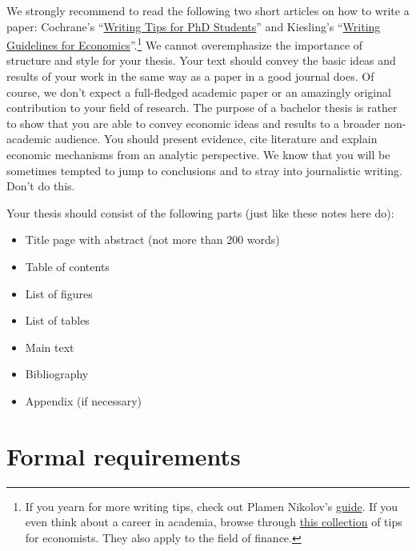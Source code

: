\documentclass[a4paper, 12pt]{article}
\begin{document}
	We strongly recommend to read the following two short articles on how to write a paper: Cochrane's ``\href{http://faculty.wcas.northwestern.edu/~mdo738/teaching/cochrane.pdf}{Writing Tips for PhD Students}'' and Kiesling's ``\href{http://nuwrite.northwestern.edu/communities/social-sciences/economics/docs/writing-advice-for-papers-in-economics/Kiesling\%20writingguidelines.pdf}{Writing Guidelines for Economics}''.\footnote{If you yearn for more writing tips, check out Plamen Nikolov's \href{http://www.people.fas.harvard.edu/~pnikolov/resources/writingtips.pdf}{guide}. If you even think about a career in academia, browse through \href{https://sites.google.com/site/mkudamatsu/tips4economists}{this collection} of tips for economists. They also apply to the field of finance.} We cannot overemphasize the importance of structure and style for your thesis. Your text should convey the basic ideas and results of your work in the same way as a paper in a good journal does. Of course, we don't expect a full-fledged academic paper or an amazingly original contribution to your field of research. The purpose of a bachelor thesis is rather to show that you are able to convey economic ideas and results to a broader non-academic audience. You should present evidence, cite literature and explain economic mechanisms from an analytic perspective. We know that you will be sometimes tempted to jump to conclusions and to stray into journalistic writing. Don't do this. 
	
	Your thesis should consist of the following parts (just like these notes here do):
    \begin{itemize}
    	\item Title page with abstract (not more than 200 words)
    	\item Table of contents
    	\item List of figures
    	\item List of tables
    	\item Main text
    	\item Bibliography
    	\item Appendix (if necessary)
    \end{itemize}
    
	\section{Formal requirements}\label{sec:formal}
	
\end{document}
